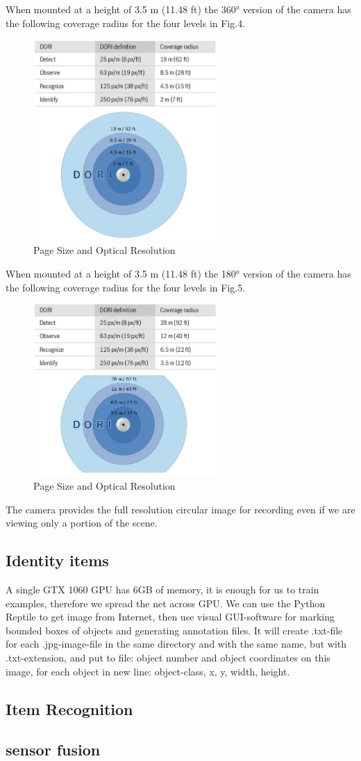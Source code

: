 When mounted at a height of 3.5 m (11.48 ft) the 360° version of the camera has the following coverage radius for the four levels in Fig.4.
\begin{figure}[htbp]
\centerline{\includegraphics[width=7cm,scale=0.8]{camera360.jpg}}
\caption{Page Size and Optical Resolution}
\label{fig}
\end{figure}

When mounted at a height of 3.5 m (11.48 ft) the 180° version of the camera has the following coverage radius for the four levels in Fig.5.
\begin{figure}[htbp]
\centerline{\includegraphics[width=7cm,scale=0.8]{camera180.jpg}}
\caption{Page Size and Optical Resolution}
\label{fig}
\end{figure}
The camera provides the full resolution circular image for recording even if we are viewing only a portion of the scene.

\subsection{Identity items}

A single GTX 1060 GPU has 6GB of memory, it is enough for us to train examples, therefore we spread the net across GPU. We can use the Python Reptile to get image from Internet, then use visual GUI-software for marking bounded boxes of objects and generating annotation files. It will create .txt-file for each .jpg-image-file in the same directory and with the same name, but with .txt-extension, and put to file: object number and object coordinates on this image, for each object in new line: object-class, x, y, width, height.

\subsection{Item Recognition}

\subsection{sensor fusion}
